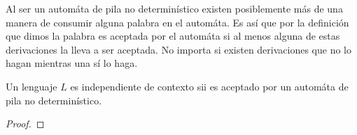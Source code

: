 \documentclass[tesis.tex]{subfiles}
\begin{document}
\begin{obs}
	Al ser un automáta de pila no determinístico existen posiblemente más de una manera de consumir alguna palabra en el automáta. Es así que por la definición que dimos la palabra es aceptada por el automáta si al menos alguna de estas derivaciones la lleva a ser aceptada. No importa si existen derivaciones que no lo hagan mientras una sí lo haga. 
\end{obs}
\medskip
\begin{teo}
Un lenguaje $L$ es independiente de contexto sii es aceptado por un automáta de pila no determinístico.
\end{teo}

\begin{proof}
\end{proof}
\end{document}
